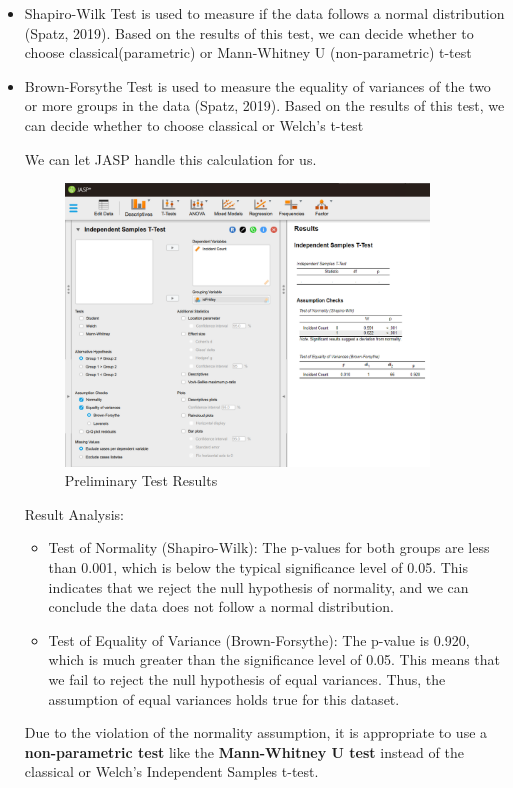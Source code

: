 \documentclass{article}
\begin{document}
\begin{itemize}
    \item Shapiro-Wilk Test is used to measure if the data follows a normal distribution (Spatz, 2019). Based on the results of this test, we can decide whether to choose classical(parametric) or Mann-Whitney U (non-parametric) t-test

    \item Brown-Forsythe Test is used to measure the equality of variances of the two or more groups in the data (Spatz, 2019). Based on the results of this test, we can decide whether to choose classical or Welch's t-test
    
    We can let JASP handle this calculation for us.

    \begin{figure}[H]
        \centering
        \includegraphics[width=0.7\linewidth, height=7.5cm]{resources/Screenshot 2024-09-27 230725.png}
        \caption{Preliminary Test Results}
        \label{fig:enter-label}
    \end{figure}

    Result Analysis:

    \begin{itemize}
        \item Test of Normality (Shapiro-Wilk): The p-values for both groups are less than 0.001, which is below the typical significance level of 0.05. This indicates that we reject the null hypothesis of normality, and we can conclude the data does not follow a normal distribution.

        \item Test of Equality of Variance (Brown-Forsythe): The p-value is 0.920, which is much greater than the significance level of 0.05. This means that we fail to reject the null hypothesis of equal variances. Thus, the assumption of equal variances holds true for this dataset.
    \end{itemize}

    Due to the violation of the normality assumption, it is appropriate to use a \textbf{non-parametric test} like the\textbf{ Mann-Whitney U test} instead of the classical or Welch's Independent Samples t-test.
    
\end{itemize}
\end{document}
